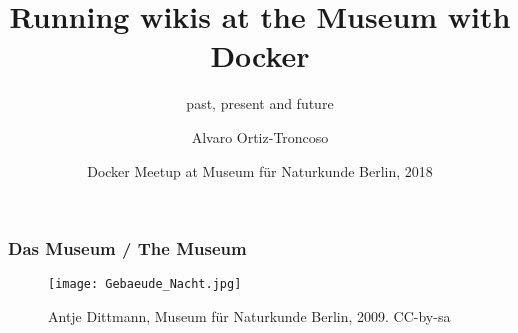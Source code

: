 % 


\title{Running wikis at the Museum with Docker}
\subtitle{past, present and future}
\author{Alvaro Ortiz-Troncoso}
\date{Docker Meetup at Museum für Naturkunde Berlin, 2018}
\subject{Computer Science}



{
  {
  \frame{\titlepage}
  }
}
\addtocounter{framenumber}{-1}
\begin{frame}
  \frametitle{Das Museum / \textcolor{mfn_green}{The Museum}}
  \begin{figure}
    \texttt{[image: Gebaeude\_Nacht.jpg]}
    \caption{\textcopyright Antje Dittmann, Museum für Naturkunde Berlin, 2009. CC-by-sa}
  \end{figure}
\end{frame}

